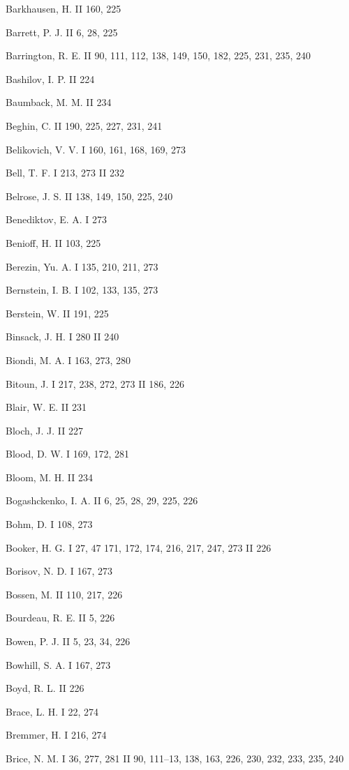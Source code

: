 \begin{theauthorindex}
\item Barkhausen, H. II 160, 225
\item Barrett, P. J. II 6, 28, 225
\item Barrington, R. E. II 90, 111, 112, 138, 149, 150, 182, 225,
      231, 235, 240
\item Bashilov, I. P. II 224
\item Baumback, M. M. II 234
\item Beghin, C. II 190, 225, 227, 231, 241
\item Belikovich, V. V. I 160, 161, 168, 169, 273
\item Bell, T. F. I 213, 273 II 232
\item Belrose, J. S. II 138, 149, 150, 225, 240
\item Benediktov, E. A. I 273
\item Benioff, H. II 103, 225
\item Berezin, Yu. A. I 135, 210, 211, 273
\item Bernstein, I. B. I 102, 133, 135, 273
\item Berstein, W. II 191, 225
\item Binsack, J. H. I 280 II 240
\item Biondi, M. A. I 163, 273, 280
\item Bitoun, J. I 217, 238, 272, 273 II 186, 226
\item Blair, W. E. II 231
\item Bloch, J. J. II 227
\item Blood, D. W. I 169, 172, 281
\item Bloom, M. H. II 234
\item Bogashckenko, I. A. II 6, 25, 28, 29, 225, 226
\item Bohm, D. I 108, 273
\item Booker, H. G. I 27, 47 171, 172, 174, 216, 217, 247, 273 II 226
\item Borisov, N. D. I 167, 273
\item Bossen, M. II 110, 217, 226
\item Bourdeau, R. E. II 5, 226
\item Bowen, P. J. II 5, 23, 34, 226
\item Bowhill, S. A. I 167, 273
\item Boyd, R. L. II 226
\item Brace, L. H. I 22, 274
\item Bremmer, H. I 216, 274
\item Brice, N. M. I 36, 277, 281 II 90, 111--13, 138, 163, 226, 230,
      232, 233, 235, 240

\end{theauthorindex}
